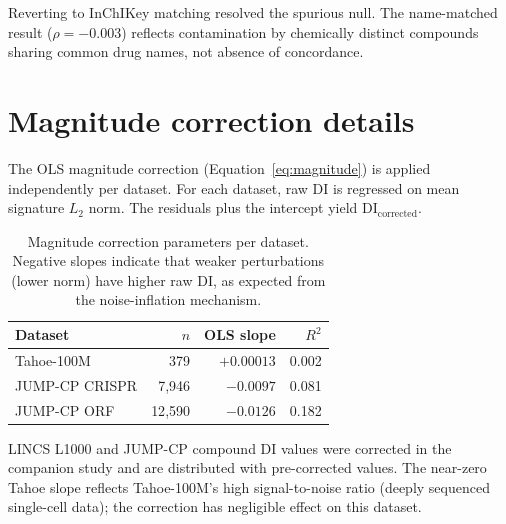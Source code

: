 \documentclass[11pt]{article}
\begin{document}
Reverting to InChIKey matching resolved the spurious null.  The
name-matched result ($\rho = -0.003$) reflects contamination by
chemically distinct compounds sharing common drug names, not absence of
concordance.

\section{Magnitude correction details}
\label{app:magnitude}

The OLS magnitude correction (Equation~\ref{eq:magnitude}) is applied
independently per dataset.  For each dataset, raw DI is regressed on
mean signature $L_2$ norm.  The residuals plus the intercept yield
$\mathrm{DI}_{\mathrm{corrected}}$.

\vspace{1em}
\begin{table}[h]
\centering
\caption{Magnitude correction parameters per dataset.  Negative slopes
indicate that weaker perturbations (lower norm) have higher raw DI, as
expected from the noise-inflation mechanism.}
\label{tab:magcorr}
\small
\begin{tabular}{lrrr}
\toprule
Dataset & $n$ & OLS slope & $R^2$ \\
\midrule
Tahoe-100M & 379 & $+0.00013$ & 0.002 \\
JUMP-CP CRISPR & 7{,}946 & $-0.0097$ & 0.081 \\
JUMP-CP ORF & 12{,}590 & $-0.0126$ & 0.182 \\
\bottomrule
\end{tabular}
\end{table}

LINCS L1000 and JUMP-CP compound DI values were corrected in the
companion study \citep{tower2026confound} and are distributed with
pre-corrected values.  The near-zero Tahoe slope reflects Tahoe-100M's
high signal-to-noise ratio (deeply sequenced single-cell data); the
correction has negligible effect on this dataset.
\end{document}
